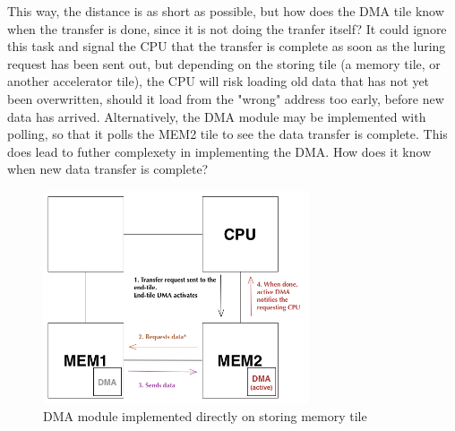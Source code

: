 This way, the distance is as short as possible, but how does the DMA tile know when the transfer is done, since it is not doing the tranfer itself?
It could ignore this task and signal the CPU that the transfer is complete as soon as the luring request has been sent out, but depending on the storing tile (a memory tile, or another accelerator tile), the CPU will risk loading old data that has not yet been overwritten, should it load from the "wrong" address too early, before new data has arrived.
Alternatively, the DMA module may be implemented with polling, so that it polls the MEM2 tile to see the data transfer is complete.
This does lead to futher complexety in implementing the DMA.
How does it know when new data transfer is complete?
 
\begin{figure}[h!]
    \centering
    \includegraphics[width=0.7\textwidth]{Figures/DMA/DMASHMAC3}
    \caption{DMA module implemented directly on storing memory tile}
    \label{fig:DMASHMAC3}
\end{figure}
 
